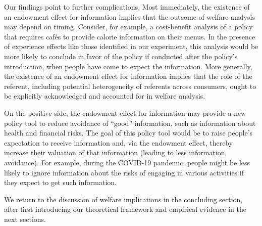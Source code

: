 Our findings point to further complications. Most immediately, the existence of an endowment effect for information implies that the outcome of welfare analysis may depend on timing. Consider, for example, a cost-benefit analysis of a policy that requires cafés to provide calorie information on their menus. In the presence of experience effects like those identified in our experiment, this analysis would be more likely to conclude in favor of the policy if conducted after the policy’s introduction, when people have come to expect the information. More generally, the existence of an endowment effect for information implies that the role of the referent, including potential heterogeneity of referents across consumers, ought to be explicitly acknowledged and accounted for in welfare analysis.


On the positive side, the endowment effect for information may provide a new policy tool to reduce avoidance of \enquote{good} information, such as information about health and financial risks. The goal of this policy tool would be to raise people's expectation to receive information and, via the endowment effect, thereby increase their valuation of that information (leading to less information avoidance). For example, during the COVID-19 pandemic, people might be less likely to ignore information about the risks of engaging in various activities if they expect to get such information.

We return to the discussion of welfare implications in the concluding section, after first introducing our theoretical framework and empirical evidence in the next sections.
